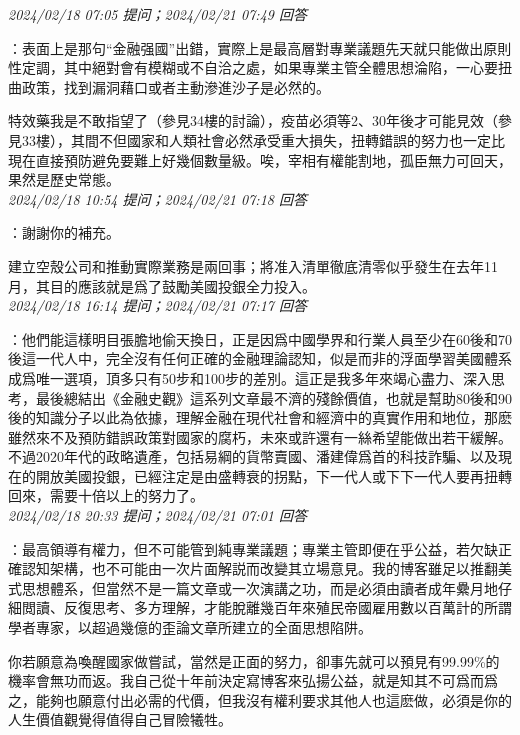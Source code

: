 \documentclass[twocolumn]{ctexart}
\begin{document}
\textit{\hfill\noindent\small 2024/02/18 07:05 提问；2024/02/21 07:49 回答}

：表面上是那句“金融强國”出錯，實際上是最高層對專業議題先天就只能做出原則性定調，其中絕對會有模糊或不自洽之處，如果專業主管全體思想淪陷，一心要扭曲政策，找到漏洞藉口或者主動滲進沙子是必然的。

特效藥我是不敢指望了（參見34樓的討論），疫苗必須等2、30年後才可能見效（參見33樓），其間不但國家和人類社會必然承受重大損失，扭轉錯誤的努力也一定比現在直接預防避免要難上好幾個數量級。唉，宰相有權能割地，孤臣無力可回天，果然是歷史常態。
\\

\textit{\hfill\noindent\small 2024/02/18 10:54 提问；2024/02/21 07:18 回答}

：謝謝你的補充。

建立空殼公司和推動實際業務是兩回事；將准入清單徹底清零似乎發生在去年11月，其目的應該就是爲了鼓勵美國投銀全力投入。
\\

\textit{\hfill\noindent\small 2024/02/18 16:14 提问；2024/02/21 07:17 回答}

：他們能這樣明目張膽地偷天換日，正是因爲中國學界和行業人員至少在60後和70後這一代人中，完全沒有任何正確的金融理論認知，似是而非的浮面學習美國體系成爲唯一選項，頂多只有50步和100步的差別。這正是我多年來竭心盡力、深入思考，最後總結出《金融史觀》這系列文章最不濟的殘餘價值，也就是幫助80後和90後的知識分子以此為依據，理解金融在現代社會和經濟中的真實作用和地位，那麽雖然來不及預防錯誤政策對國家的腐朽，未來或許還有一絲希望能做出若干緩解。不過2020年代的政略遺產，包括易綱的貨幣賣國、潘建偉爲首的科技詐騙、以及現在的開放美國投銀，已經注定是由盛轉衰的拐點，下一代人或下下一代人要再扭轉回來，需要十倍以上的努力了。
\\

\textit{\hfill\noindent\small 2024/02/18 20:33 提问；2024/02/21 07:01 回答}

：最高領導有權力，但不可能管到純專業議題；專業主管即便在乎公益，若欠缺正確認知架構，也不可能由一次片面解説而改變其立場意見。我的博客雖足以推翻美式思想體系，但當然不是一篇文章或一次演講之功，而是必須由讀者成年纍月地仔細閲讀、反復思考、多方理解，才能脫離幾百年來殖民帝國雇用數以百萬計的所謂學者專家，以超過幾億的歪論文章所建立的全面思想陷阱。

你若願意為喚醒國家做嘗試，當然是正面的努力，卻事先就可以預見有99.99\%的機率會無功而返。我自己從十年前決定寫博客來弘揚公益，就是知其不可爲而爲之，能夠也願意付出必需的代價，但我沒有權利要求其他人也這麽做，必須是你的人生價值觀覺得值得自己冒險犧牲。
\\
\end{document}

